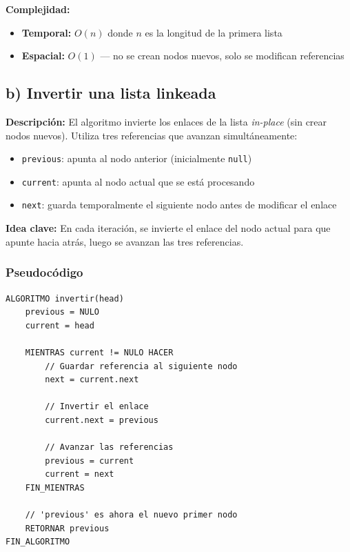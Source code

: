 \documentclass[12pt]{article}
\newcommand{\codigo}[1]{\texttt{\small #1}}
\begin{document}
\textbf{Complejidad:}
\begin{itemize}
    \item \textbf{Temporal:} $O(n)$ donde $n$ es la longitud de la primera lista
    \item \textbf{Espacial:} $O(1)$ --- no se crean nodos nuevos, solo se modifican referencias
\end{itemize}

\newpage

\subsection*{b) Invertir una lista linkeada}

\textbf{Descripción:} El algoritmo invierte los enlaces de la lista \textit{in-place} (sin crear nodos nuevos). Utiliza tres referencias que avanzan simultáneamente:

\begin{itemize}
    \item \codigo{previous}: apunta al nodo anterior (inicialmente \codigo{null})
    \item \codigo{current}: apunta al nodo actual que se está procesando
    \item \codigo{next}: guarda temporalmente el siguiente nodo antes de modificar el enlace
\end{itemize}

\textbf{Idea clave:} En cada iteración, se invierte el enlace del nodo actual para que apunte hacia atrás, luego se avanzan las tres referencias.

\subsubsection*{Pseudocódigo}

\begin{lstlisting}[style=pseudocodigo]
ALGORITMO invertir(head)
    previous = NULO
    current = head

    MIENTRAS current != NULO HACER
        // Guardar referencia al siguiente nodo
        next = current.next

        // Invertir el enlace
        current.next = previous

        // Avanzar las referencias
        previous = current
        current = next
    FIN_MIENTRAS

    // 'previous' es ahora el nuevo primer nodo
    RETORNAR previous
FIN_ALGORITMO
\end{lstlisting}
\end{document}
